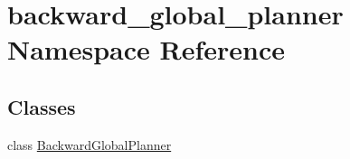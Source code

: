 \hypertarget{namespacebackward__global__planner}{}\section{backward\+\_\+global\+\_\+planner Namespace Reference}
\label{namespacebackward__global__planner}
\subsection*{Classes}
\begin{DoxyCompactItemize}
\item 
class \hyperlink{classbackward__global__planner_1_1BackwardGlobalPlanner}{Backward\+Global\+Planner}
\end{DoxyCompactItemize}

